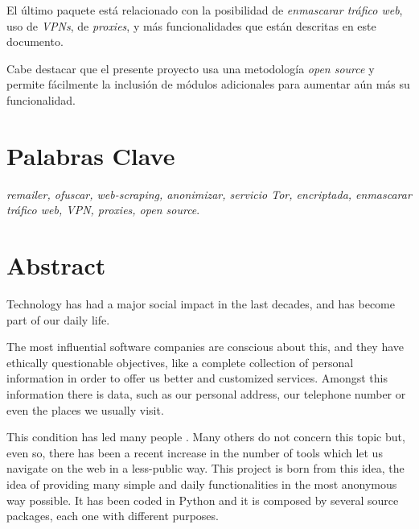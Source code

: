 El último paquete está relacionado con la posibilidad de
\textit{enmascarar tráfico web}, uso de \textit{VPNs}, de
\textit{proxies}, y más funcionalidades que están descritas en este
documento.

Cabe destacar que el presente proyecto usa una metodología
\textit{open source} y permite fácilmente la inclusión de módulos
adicionales para aumentar aún más su funcionalidad.

\section*{Palabras Clave}
\textit{remailer, ofuscar, web-scraping, anonimizar, servicio Tor, encriptada, enmascarar tráfico web, VPN, proxies, open source}.
\newpage

\section*{Abstract}
Technology has had a major social impact in the last decades, and has become part of our daily life.

The most influential software companies are conscious about this, and
they have ethically questionable objectives, like a complete
collection of personal information in order to offer us better and
customized services. Amongst this information there is
 data, such as our personal address, our telephone
number or even the places we usually visit. 

This condition has led many people . Many others do not concern this topic but, even so, there
has been a recent increase in the number of tools which let us
navigate on the web in a less-public way. This project is born from
this idea, the idea of providing many simple and daily functionalities
in the most anonymous way possible. It has been coded in Python and it
is composed by several source packages, each one with different
purposes.

